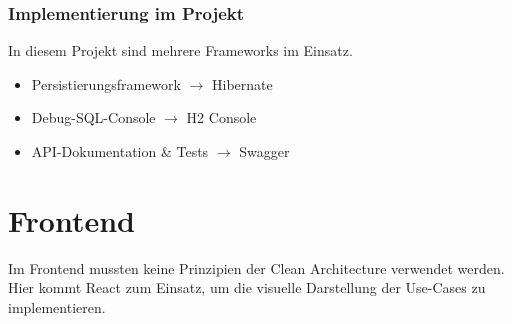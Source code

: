     	    \subsubsection{Implementierung im Projekt}
    	    In diesem Projekt sind mehrere Frameworks im Einsatz. \\
    	    \begin{itemize}
    	        \item Persistierungsframework $\rightarrow$ Hibernate
    	        \item Debug-SQL-Console $\rightarrow$ H2 Console
    	        \item API-Dokumentation \& Tests $\rightarrow$ Swagger
    	    \end{itemize}

    \section{Frontend}
    Im Frontend mussten keine Prinzipien der Clean Architecture verwendet werden. Hier kommt React zum Einsatz, um die visuelle Darstellung der Use-Cases zu implementieren.